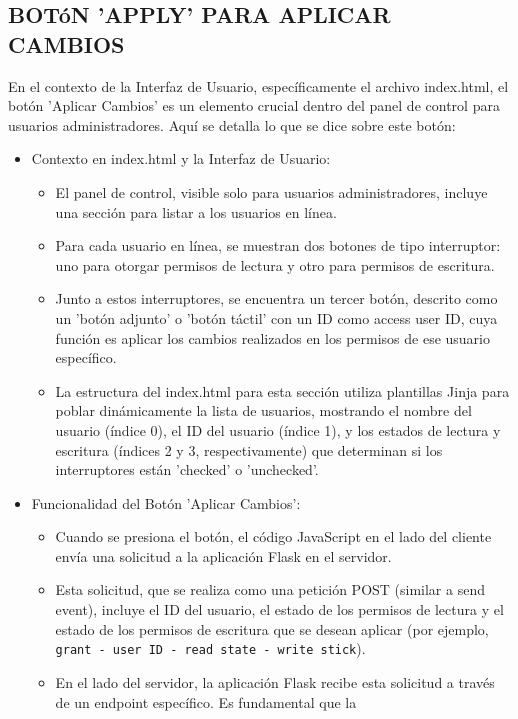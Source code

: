 \documentclass{report}
\begin{document}
\subsection{BOTóN 'APPLY' PARA APLICAR CAMBIOS}
En el contexto de la Interfaz de Usuario, específicamente el archivo index.html, el botón 'Aplicar Cambios' es un elemento crucial 
dentro del panel de control para usuarios administradores.
Aquí se detalla lo que se dice sobre este botón:
\begin{itemize}
    \item Contexto en index.html y la Interfaz de Usuario:
    \begin{itemize}
        \item El panel de control, visible solo para usuarios administradores, incluye una sección para listar a los usuarios en línea.
        \item Para cada usuario en línea, se muestran dos botones de tipo interruptor: uno para otorgar permisos de lectura y otro para 
        permisos de escritura.
        \item Junto a estos interruptores, se encuentra un tercer botón, descrito como un 'botón adjunto' o 'botón táctil' con un ID como 
        access user ID, cuya función es aplicar los cambios realizados en los permisos de ese usuario específico.
        \item La estructura del index.html para esta sección utiliza plantillas Jinja para poblar dinámicamente la lista de usuarios, 
        mostrando el nombre del usuario (índice 0), el ID del usuario (índice 1), y los estados de lectura y escritura (índices 2 y 3, 
        respectivamente) que determinan si los interruptores están 'checked' o 'unchecked'.
    \end{itemize}
    \item Funcionalidad del Botón 'Aplicar Cambios':
    \begin{itemize}
        \item Cuando se presiona el botón, el código JavaScript en el lado del cliente envía una solicitud a la aplicación Flask en el servidor.
        \item Esta solicitud, que se realiza como una petición POST (similar a send event), incluye el ID del usuario, el estado de los permisos 
        de lectura y el estado de los permisos de escritura que se desean aplicar (por ejemplo, \verb|grant - user ID - read state - write stick|).
        \item En el lado del servidor, la aplicación Flask recibe esta solicitud a través de un endpoint específico. Es fundamental que la 

\end{itemize}
\end{itemize}
\end{document}
